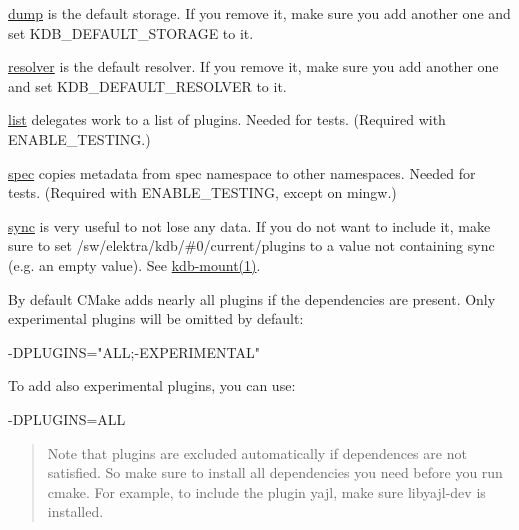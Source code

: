 \begin{DoxyItemize}
\item \hyperlink{md_src_plugins_dump_README_src_plugins_dump_README_md}{dump} is the default storage. If you remove it, make sure you add another one and set {\ttfamily K\+D\+B\+\_\+\+D\+E\+F\+A\+U\+L\+T\+\_\+\+S\+T\+O\+R\+A\+GE} to it.
\item \hyperlink{md_src_plugins_resolver_README_src_plugins_resolver_README_md}{resolver} is the default resolver. If you remove it, make sure you add another one and set {\ttfamily K\+D\+B\+\_\+\+D\+E\+F\+A\+U\+L\+T\+\_\+\+R\+E\+S\+O\+L\+V\+ER} to it.
\item \hyperlink{md_src_plugins_list_README_src_plugins_list_README_md}{list} delegates work to a list of plugins. Needed for tests. (Required with {\ttfamily E\+N\+A\+B\+L\+E\+\_\+\+T\+E\+S\+T\+I\+NG}.)
\item \hyperlink{md_src_plugins_spec_README_src_plugins_spec_README_md}{spec} copies metadata from spec namespace to other namespaces. Needed for tests. (Required with {\ttfamily E\+N\+A\+B\+L\+E\+\_\+\+T\+E\+S\+T\+I\+NG}, except on mingw.)
\item \hyperlink{md_src_plugins_sync_README_src_plugins_sync_README_md}{sync} is very useful to not lose any data. If you do not want to include it, make sure to set {\ttfamily /sw/elektra/kdb/\#0/current/plugins} to a value not containing sync (e.\+g. an empty value). See \hyperlink{doc_help_kdb-mount_md}{kdb-\/mount(1)}.
\end{DoxyItemize}

By default C\+Make adds nearly all plugins if the dependencies are present. Only experimental plugins will be omitted by default\+:


\begin{DoxyCode}
-DPLUGINS="ALL;-EXPERIMENTAL"
\end{DoxyCode}


To add also experimental plugins, you can use\+:


\begin{DoxyCode}
-DPLUGINS=ALL
\end{DoxyCode}


\begin{quote}
Note that plugins are excluded automatically if dependences are not satisfied. So make sure to install all dependencies you need before you run {\ttfamily cmake}. For example, to include the plugin {\ttfamily yajl}, make sure {\ttfamily libyajl-\/dev} is installed. \end{quote}


